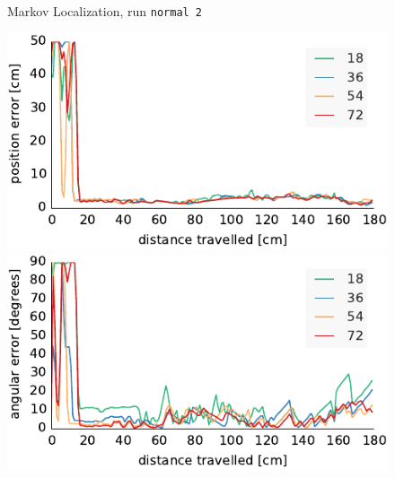 \documentclass[letterpaper, 10pt, conference]{ieeeconf}
\begin{document}
\begin{figure}
\begin{center}
Markov Localization, run \texttt{normal 2}
\end{center}
\includegraphics{ml-whole_random_2-xy}\hfill
\includegraphics{ml-whole_random_2-theta}

\vspace{.5em}


\end{figure}
\end{document}
